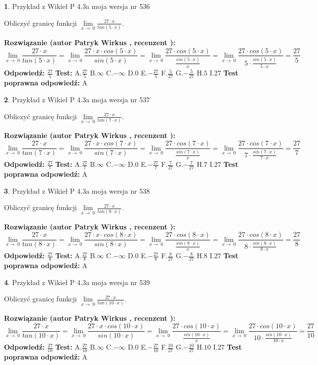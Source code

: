 \documentclass[12pt, a4paper]{article}
\theoremstyle{definition} %
\newtheorem{zad}{}
\newcommand{\zadStart}[1]{\begin{zad}#1\newline}
\newcommand{\zadStop}{\end{zad}}
\newcommand{\rozwStart}[2]{\noindent \textbf{Rozwiązanie (autor #1 , recenzent #2): }\newline}
\newcommand{\rozwStop}{\newline}
\newcommand{\odpStart}{\noindent \textbf{Odpowiedź:}\newline}
\newcommand{\odpStop}{\newline}
\newcommand{\testStart}{\noindent \textbf{Test:}\newline}
\newcommand{\testStop}{\newline}
\newcommand{\kluczStart}{\noindent \textbf{Test poprawna odpowiedź:}\newline}
\newcommand{\kluczStop}{\newline}
\begin{document}
\zadStart{Przykład z Wikieł P 4.3a moja wersja nr 536}


Obliczyć granicę funkcji $\lim\limits_{x\to\ 0}\frac{27 \cdot x}{tan(5 \cdot x)}$.
\zadStop
\rozwStart{Patryk Wirkus}{}
$$\lim\limits_{x\to\ 0}\frac{27 \cdot x}{tan(5 \cdot x)}=\lim\limits_{x\to\ 0}\frac{27 \cdot x \cdot cos(5 \cdot x)}{sin(5 \cdot x)}=\lim\limits_{x\to\ 0}\frac{27 \cdot cos(5 \cdot x)}{\frac{sin(5 \cdot x)}{x}}=\lim\limits_{x\to\ 0}\frac{27 \cdot cos(5 \cdot x)}{5 \cdot \frac{sin(5 \cdot x)}{5 \cdot x}} = \frac{27}{5}$$
\rozwStop
\odpStart
$\frac{27}{5}$
\odpStop
\testStart
A.$\frac{27}{5}$
B.$\infty$
C.$-\infty$
D.$0$
E.$-\frac{27}{5}$
F.$\frac{5}{27}$
G.$-\frac{5}{27}$
H.$5$
I.$27$
\testStop
\kluczStart
A
\kluczStop



\zadStart{Przykład z Wikieł P 4.3a moja wersja nr 537}


Obliczyć granicę funkcji $\lim\limits_{x\to\ 0}\frac{27 \cdot x}{tan(7 \cdot x)}$.
\zadStop
\rozwStart{Patryk Wirkus}{}
$$\lim\limits_{x\to\ 0}\frac{27 \cdot x}{tan(7 \cdot x)}=\lim\limits_{x\to\ 0}\frac{27 \cdot x \cdot cos(7 \cdot x)}{sin(7 \cdot x)}=\lim\limits_{x\to\ 0}\frac{27 \cdot cos(7 \cdot x)}{\frac{sin(7 \cdot x)}{x}}=\lim\limits_{x\to\ 0}\frac{27 \cdot cos(7 \cdot x)}{7 \cdot \frac{sin(7 \cdot x)}{7 \cdot x}} = \frac{27}{7}$$
\rozwStop
\odpStart
$\frac{27}{7}$
\odpStop
\testStart
A.$\frac{27}{7}$
B.$\infty$
C.$-\infty$
D.$0$
E.$-\frac{27}{7}$
F.$\frac{7}{27}$
G.$-\frac{7}{27}$
H.$7$
I.$27$
\testStop
\kluczStart
A
\kluczStop



\zadStart{Przykład z Wikieł P 4.3a moja wersja nr 538}


Obliczyć granicę funkcji $\lim\limits_{x\to\ 0}\frac{27 \cdot x}{tan(8 \cdot x)}$.
\zadStop
\rozwStart{Patryk Wirkus}{}
$$\lim\limits_{x\to\ 0}\frac{27 \cdot x}{tan(8 \cdot x)}=\lim\limits_{x\to\ 0}\frac{27 \cdot x \cdot cos(8 \cdot x)}{sin(8 \cdot x)}=\lim\limits_{x\to\ 0}\frac{27 \cdot cos(8 \cdot x)}{\frac{sin(8 \cdot x)}{x}}=\lim\limits_{x\to\ 0}\frac{27 \cdot cos(8 \cdot x)}{8 \cdot \frac{sin(8 \cdot x)}{8 \cdot x}} = \frac{27}{8}$$
\rozwStop
\odpStart
$\frac{27}{8}$
\odpStop
\testStart
A.$\frac{27}{8}$
B.$\infty$
C.$-\infty$
D.$0$
E.$-\frac{27}{8}$
F.$\frac{8}{27}$
G.$-\frac{8}{27}$
H.$8$
I.$27$
\testStop
\kluczStart
A
\kluczStop



\zadStart{Przykład z Wikieł P 4.3a moja wersja nr 539}


Obliczyć granicę funkcji $\lim\limits_{x\to\ 0}\frac{27 \cdot x}{tan(10 \cdot x)}$.
\zadStop
\rozwStart{Patryk Wirkus}{}
$$\lim\limits_{x\to\ 0}\frac{27 \cdot x}{tan(10 \cdot x)}=\lim\limits_{x\to\ 0}\frac{27 \cdot x \cdot cos(10 \cdot x)}{sin(10 \cdot x)}=\lim\limits_{x\to\ 0}\frac{27 \cdot cos(10 \cdot x)}{\frac{sin(10 \cdot x)}{x}}=\lim\limits_{x\to\ 0}\frac{27 \cdot cos(10 \cdot x)}{10 \cdot \frac{sin(10 \cdot x)}{10 \cdot x}} = \frac{27}{10}$$
\rozwStop
\odpStart
$\frac{27}{10}$
\odpStop
\testStart
A.$\frac{27}{10}$
B.$\infty$
C.$-\infty$
D.$0$
E.$-\frac{27}{10}$
F.$\frac{10}{27}$
G.$-\frac{10}{27}$
H.$10$
I.$27$
\testStop
\kluczStart
A
\kluczStop
\end{document}
